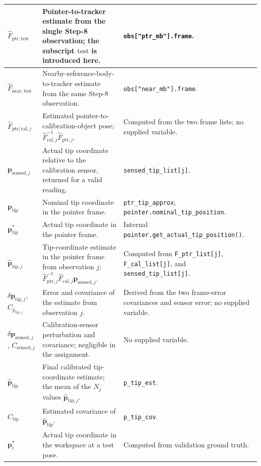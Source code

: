 \documentclass[11pt]{article}
\newcommand{\vct}[1]{\bm{#1}}
\begin{document}
\begin{longtable}{p{}p{}p{}}
$\widehat F_{\mathrm{ptr},\mathrm{test}}$ & Pointer-to-tracker estimate from the single Step-8 observation; the subscript $\mathrm{test}$ is introduced here. & \texttt{obs["ptr\_mb"].frame}. \\\midrule
$\widehat F_{\mathrm{near},\mathrm{test}}$ & Nearby-reference-body-to-tracker estimate from the same Step-8 observation. & \texttt{obs["near\_mb"].frame}. \\\midrule
$\widehat F_{\mathrm{ptr/cal},j}$ & Estimated pointer-to-calibration-object pose; $\widehat F_{\mathrm{cal},j}^{-1}\widehat F_{\mathrm{ptr},j}$. & Computed from the two frame lists; no supplied variable. \\\midrule
$\vct{p}_{\mathrm{sensed},j}$ & Actual tip coordinate relative to the calibration sensor, returned for a valid reading. & \texttt{sensed\_tip\_list[j]}. \\\midrule
$\vct{p}_{\mathrm{tip}}$ & Nominal tip coordinate in the pointer frame. & \texttt{ptr\_tip\_approx}; \texttt{pointer.nominal\_tip\_position}. \\\midrule
$\vct{p}_{\mathrm{tip}}^*$ & Actual tip coordinate in the pointer frame. & Internal \texttt{pointer.get\_actual\_tip\_position()}. \\\midrule
$\widehat{\vct{p}}_{\mathrm{tip},j}$ & Tip-coordinate estimate in the pointer frame from observation $j$; $\widehat F_{\mathrm{ptr},j}^{-1}\widehat F_{\mathrm{cal},j}\vct{p}_{\mathrm{sensed},j}$. & Computed from \texttt{F\_ptr\_list[j]}, \texttt{F\_cal\_list[j]}, and \texttt{sensed\_tip\_list[j]}. \\\midrule
$\delta\vct{p}_{\mathrm{tip},j}$, $C_{\widehat p_{\mathrm{tip},j}}$ & Error and covariance of the estimate from observation $j$. & Derived from the two frame-error covariances and sensor error; no supplied variable. \\\midrule
$\delta\vct{p}_{\mathrm{sensed},j}$, $C_{\mathrm{sensed},j}$ & Calibration-sensor perturbation and covariance; negligible in the assignment. & No supplied variable. \\\midrule
$\widehat{\vct{p}}_{\mathrm{tip}}$ & Final calibrated tip-coordinate estimate; the mean of the $N_j$ values $\widehat{\vct{p}}_{\mathrm{tip},j}$. & \texttt{p\_tip\_est}. \\\midrule
$\widehat C_{\mathrm{tip}}$ & Estimated covariance of $\widehat{\vct{p}}_{\mathrm{tip}}$. & \texttt{p\_tip\_cov}. \\\midrule
$\vct{p}_t^*$ & Actual tip coordinate in the workspace at a test pose. & Computed from validation ground truth. \\\midrule

\end{longtable}
\end{document}
